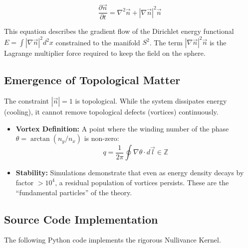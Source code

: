 \begin{equation}
    \boxed{ \frac{\partial \vec{n}}{\partial t} = \nabla^2 \vec{n} + |\nabla \vec{n}|^2 \vec{n} }
\end{equation}

This equation describes the gradient flow of the Dirichlet energy functional $E = \int |\nabla \vec{n}|^2 d^2x$ constrained to the manifold $S^2$. The term $|\nabla \vec{n}|^2 \vec{n}$ is the Lagrange multiplier force required to keep the field on the sphere.

\subsection{Emergence of Topological Matter}

The constraint $|\vec{n}|=1$ is topological. While the system dissipates energy (cooling), it cannot remove topological defects (vortices) continuously.

\begin{itemize}
    \item \textbf{Vortex Definition:} A point where the winding number of the phase $\theta = \arctan(n_y/n_x)$ is non-zero:
    \begin{equation}
        q = \frac{1}{2\pi} \oint \nabla \theta \cdot d\vec{l} \in \mathbb{Z}
    \end{equation}
    \item \textbf{Stability:} Simulations demonstrate that even as energy density decays by factor $> 10^4$, a residual population of vortices persists. These are the ``fundamental particles'' of the theory.
\end{itemize}

\subsection{Source Code Implementation}

The following Python code implements the rigorous Nullivance Kernel.

